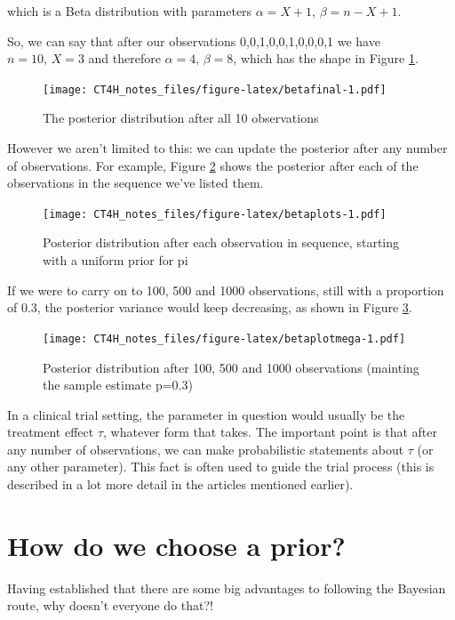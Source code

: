 \documentclass[
  openany]{book}
\theoremstyle{definition}
\theoremstyle{definition}
\theoremstyle{definition}
\theoremstyle{definition}
\theoremstyle{remark}
\begin{document}
which is a Beta distribution with parameters \(\alpha=X+1,\,\beta=n-X+1\).

So, we can say that after our observations 0,0,1,0,0,1,0,0,0,1 we have \(n=10,\,X=3\) and therefore \(\alpha=4,\,\beta=8\), which has the shape in Figure \ref{fig:betafinal}.

\begin{figure}
\centering
\texttt{[image: CT4H\_notes\_files/figure-latex/betafinal-1.pdf]}
\caption{\label{fig:betafinal}The posterior distribution after all 10 observations}
\end{figure}

However we aren't limited to this: we can update the posterior after any number of observations. For example, Figure \ref{fig:betaplots} shows the posterior after each of the observations in the sequence we've listed them.

\begin{figure}
\centering
\texttt{[image: CT4H\_notes\_files/figure-latex/betaplots-1.pdf]}
\caption{\label{fig:betaplots}Posterior distribution after each observation in sequence, starting with a uniform prior for pi}
\end{figure}

If we were to carry on to 100, 500 and 1000 observations, still with a proportion of 0.3, the posterior variance would keep decreasing, as shown in Figure \ref{fig:betaplotmega}.

\begin{figure}
\centering
\texttt{[image: CT4H\_notes\_files/figure-latex/betaplotmega-1.pdf]}
\caption{\label{fig:betaplotmega}Posterior distribution after 100, 500 and 1000 observations (mainting the sample estimate p=0.3)}
\end{figure}

In a clinical trial setting, the parameter in question would usually be the treatment effect \(\tau\), whatever form that takes. The important point is that after any number of observations, we can make probabilistic statements about \(\tau\) (or any other parameter). This fact is often used to guide the trial process (this is described in a lot more detail in the articles mentioned earlier).

\hypertarget{how-do-we-choose-a-prior}{%
\section{How do we choose a prior?}\label{how-do-we-choose-a-prior}}

Having established that there are some big advantages to following the Bayesian route, why doesn't everyone do that?!
\end{document}
